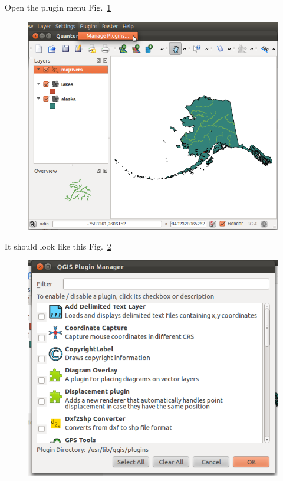 Open the plugin menu Fig.~\ref{fig:qgis008}

\begin{figure}[htbp]
   \centering
   \includegraphics[scale=0.19]{qgis008.png}
   \caption{}
   \label{fig:qgis008}
\end{figure}

It should look like this Fig.~\ref{fig:qgis009}

\begin{figure}[htbp]
   \centering
   \includegraphics[scale=0.19]{qgis009.png}
   \caption{}
   \label{fig:qgis009}
\end{figure}

